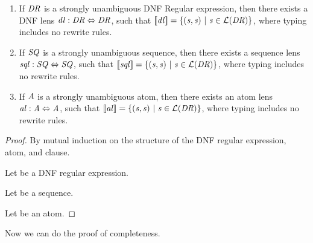 \begin{lemma}
\leavevmode
\begin{enumerate}
\item If $\mathit{DR}$ is a strongly unambiguous DNF Regular expression, then
there exists a DNF lens $\mathit{dl} : \mathit{DR} \Leftrightarrow \mathit{DR}$,
such that $[ \! [\mathit{dl}] \! ]=
\{(\mathit{s},\mathit{s})~|~\mathit{s}\in\mathcal{L}(\mathit{DR})\}$, where
\DNFLens{} typing includes no rewrite rules.
\item If $\mathit{SQ}$ is a strongly unambiguous sequence, then
there exists a sequence lens $\mathit{sql} : \mathit{SQ} \Leftrightarrow \mathit{SQ}$,
such that $[ \! [\mathit{sql}] \! ]=
\{(\mathit{s},\mathit{s})~|~\mathit{s}\in\mathcal{L}(\mathit{DR})\}$, where
\SequenceLens{} typing includes no rewrite rules.
\item If $\mathit{A}$ is a strongly unambiguous atom, then
there exists an atom lens $\mathit{al} : \mathit{A} \Leftrightarrow \mathit{A}$,
such that $[ \! [\mathit{al}] \! ]=
\{(\mathit{s},\mathit{s})~|~\mathit{s}\in\mathcal{L}(\mathit{DR})\}$, where
\AtomLens{} typing includes no rewrite rules.
\end{enumerate}
\end{lemma}
\begin{proof}
By mutual induction on the structure of the DNF regular expression,
atom, and clause.

Let \DNFRegex{} be a DNF regular expression.

Let \Sequence{} be a sequence.

Let \Atom{} be an atom.
\end{proof}

Now we can do the proof of completeness.
\dnflc*

